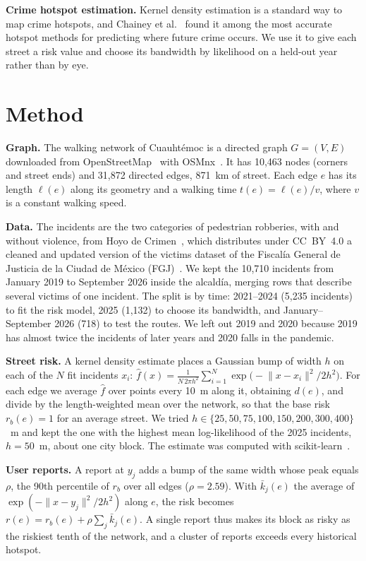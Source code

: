 \documentclass{article}
\begin{document}
\textbf{Crime hotspot estimation.} Kernel density estimation is a standard way to map crime
hotspots, and Chainey et al.~\cite{chainey2008utility} found it among the most accurate hotspot
methods for predicting where future crime occurs. We use it to give each street a risk value and
choose its bandwidth by likelihood on a held-out year rather than by eye.

\section{Method}
\label{sec:method}

\textbf{Graph.} The walking network of Cuauhtémoc is a directed graph $G=(V,E)$ downloaded from
OpenStreetMap~\cite{osm2026} with OSMnx~\cite{boeing2017osmnx}. It has 10,463 nodes (corners and
street ends) and 31,872 directed edges, 871~km of street. Each edge $e$ has its length $\ell(e)$
along its geometry and a walking time $t(e)=\ell(e)/v$, where $v$ is a constant walking speed.

\textbf{Data.} The incidents are the two categories of pedestrian robberies, with and without
violence, from Hoyo de Crimen~\cite{hoyodecrimen}, which distributes under CC~BY~4.0 a cleaned and
updated version of the victims dataset of the Fiscalía General de Justicia de la Ciudad de México (FGJ)~\cite{fgj2026victimas}. We kept
the 10,710 incidents from January 2019 to September 2026 inside the alcaldía, merging rows that
describe several victims of one incident. The split is by time: 2021--2024 (5,235 incidents) to
fit the risk model, 2025 (1,132) to choose its bandwidth, and January--September 2026 (718) to
test the routes. We left out 2019 and 2020 because 2019 has almost twice the incidents of later
years and 2020 falls in the pandemic.

\textbf{Street risk.} A kernel density estimate places a Gaussian bump of width $h$ on each of
the $N$ fit incidents $x_i$:
$\hat f(x) = \frac{1}{N\,2\pi h^2}\sum_{i=1}^{N} \exp\!\big(-\lVert x-x_i\rVert^2/2h^2\big)$.
For each edge we average $\hat f$ over points every 10~m along it, obtaining $d(e)$, and divide by
the length-weighted mean over the network, so that the base risk $r_b(e)=1$ for an average street.
We tried $h\in\{25,50,75,100,150,200,300,400\}$~m and kept the one with the highest mean
log-likelihood of the 2025 incidents, $h=50$~m, about one city block. The estimate was computed
with scikit-learn~\cite{pedregosa2011scikit}.

\textbf{User reports.} A report at $y_j$ adds a bump of the same width whose peak equals $\rho$,
the 90th percentile of $r_b$ over all edges ($\rho=2.59$). With $\bar k_j(e)$ the average of
$\exp(-\lVert x-y_j\rVert^2/2h^2)$ along $e$, the risk becomes
$r(e) = r_b(e) + \rho\sum_j \bar k_j(e)$. A single report thus makes its block as risky as the
riskiest tenth of the network, and a cluster of reports exceeds every historical hotspot.
\end{document}
